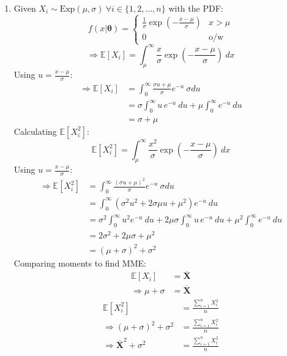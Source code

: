\documentclass[11pt]{article}
\newcommand{\mean}[1]{\boldsymbol{\overline{#1}}}
\begin{document}
\begin{enumerate}
\begin{enumerate}
      \item[(iii)] Given $X_i \sim \text{Exp}(\mu, \sigma) ~ \forall i \in \{1, 2, \dots, n\}$ with the PDF:
      \[f(x|\boldsymbol{\theta}) = \begin{cases}
        \frac 1 \sigma \exp\left(-\frac{x - \mu}{\sigma}\right) & x > \mu \\
        0 & \text{o/w}
      \end{cases}\]
      \[\Rightarrow \mathbb{E}[X_i] = \int_{\mu}^{\infty} \frac x \sigma \exp\left(-\frac{x - \mu}{\sigma}\right) ~ dx \]
      Using $u = \frac{x - \mu}{\sigma}$:
      \begin{align*}
        \Rightarrow \mathbb{E}[X_i] &= \int_{0}^{\infty} \frac{\sigma u + \mu}{\sigma} e^{-u} ~ \sigma du \\
        &= \sigma \int_{0}^{\infty} u \, e^{-u} ~ du + \mu \int_{0}^{\infty} e^{-u} ~ du \\
        &= \sigma + \mu
      \end{align*}
      Calculating $\mathbb{E}[X_i^2]$:
      \[\mathbb{E}[X_i^2] = \int_{\mu}^{\infty} \frac{x^2}{\sigma} \exp\left(-\frac{x - \mu}{\sigma}\right) ~ dx\]
      Using $u = \frac{x - \mu}{\sigma}$:
      \begin{align*}
        \Rightarrow \mathbb{E}[X_i^2] &= \int_{0}^{\infty} \frac{(\sigma u + \mu)^2}{\sigma} e^{-u} ~ \sigma du \\
        &= \int_{0}^{\infty} (\sigma^2 u^2 + 2 \sigma \mu u + \mu^2) e^{-u} ~ du \\
        &= \sigma^2 \int_{0}^{\infty} u^2 e^{-u} ~ du + 2 \mu \sigma \int_{0}^{\infty} u \, e^{-u} ~ du + \mu^2 \int_{0}^{\infty} e^{-u} ~ du \\
        &= 2 \sigma^2 + 2 \mu \sigma + \mu^2 \\
        &= (\mu + \sigma)^2 + \sigma^2
      \end{align*}
      Comparing moments to find MME:
      \begin{align*}
        \mathbb{E}[X_i] &= \mean{X} \\
        \Rightarrow \mu + \sigma &= \mean{X}
      \end{align*}
      \begin{align*}
        \mathbb{E}[X_i^2] &= \frac{\sum_{i = 1}^{n} X_i^2}{n} \\
        \Rightarrow (\mu + \sigma)^2 + \sigma^2 &= \frac{\sum_{i = 1}^{n} X_i^2}{n} \\
        \Rightarrow \mean{X}^2 + \sigma^2 &= \frac{\sum_{i = 1}^{n} X_i^2}{n} \\

\end{align*}
\end{enumerate}
\end{enumerate}
\end{document}
